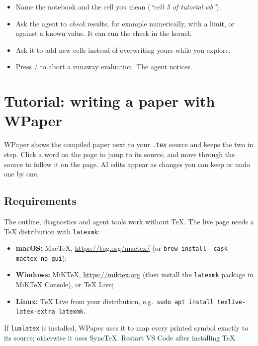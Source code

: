 \documentclass[11pt,a4paper]{article}
\newcommand{\kbd}[1]{\tcbox[on line,boxsep=0pt,left=3pt,right=3pt,top=1.5pt,bottom=1.5pt,
  colback=white,colframe=black!35,boxrule=0.4pt,arc=2pt]{\footnotesize\ttfamily #1}}
\begin{document}
\begin{tip}
\begin{itemize}[leftmargin=1.2em]
  \item Name the notebook and the cell you mean (\emph{``cell 5 of tutorial.wb''}).
  \item Ask the agent to \emph{check} results, for example numerically, with a limit, or against a known value. It can run the check in the kernel.
  \item Ask it to add new cells instead of overwriting yours while you explore.
  \item Press \kbd{Cmd+.} / \kbd{Ctrl+.} to abort a runaway evaluation. The agent notices.
\end{itemize}
\end{tip}

\newpage
\section{Tutorial: writing a paper with WPaper}

WPaper shows the compiled paper next to your \texttt{.tex} source and keeps the two in step. Click a word on the page to jump to its source, and move through the source to follow it on the page. AI edits appear as changes you can keep or undo one by one.

\subsection{Requirements}
The outline, diagnostics and agent tools work without TeX. The live page needs a TeX distribution with \texttt{latexmk}:
\begin{itemize}[leftmargin=1.6em]
  \item \textbf{macOS:} MacTeX, \url{https://tug.org/mactex/} (or \texttt{brew install --cask mactex-no-gui});
  \item \textbf{Windows:} MiKTeX, \url{https://miktex.org} (then install the \texttt{latexmk} package in MiKTeX Console), or TeX Live;
  \item \textbf{Linux:} TeX Live from your distribution, e.g.\ \texttt{sudo apt install texlive-latex-extra latexmk}.
\end{itemize}
If \texttt{lualatex} is installed, WPaper uses it to map every printed symbol exactly to its source; otherwise it uses SyncTeX. Restart VS Code after installing TeX.
\end{document}
